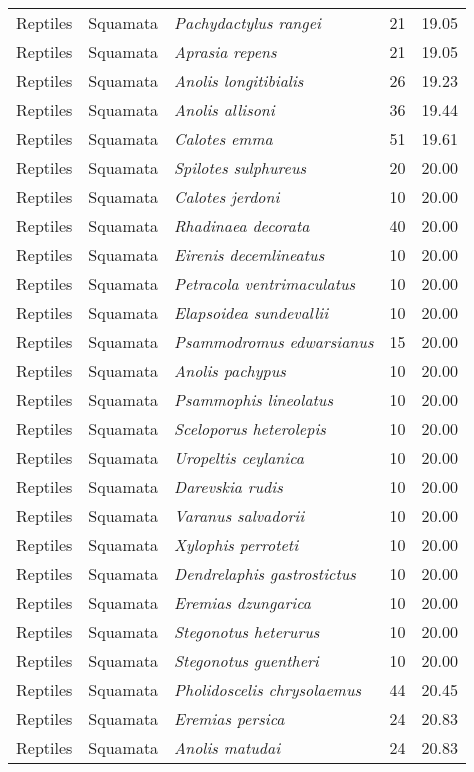 \begin{longtable}{ll>{\itshape}lcc}
  Reptiles & Squamata & Pachydactylus rangei &  21 & 19.05 \\ 
  Reptiles & Squamata & Aprasia repens &  21 & 19.05 \\ 
  Reptiles & Squamata & Anolis longitibialis &  26 & 19.23 \\ 
  Reptiles & Squamata & Anolis allisoni &  36 & 19.44 \\ 
  Reptiles & Squamata & Calotes emma &  51 & 19.61 \\ 
  Reptiles & Squamata & Spilotes sulphureus &  20 & 20.00 \\ 
  Reptiles & Squamata & Calotes jerdoni &  10 & 20.00 \\ 
  Reptiles & Squamata & Rhadinaea decorata &  40 & 20.00 \\ 
  Reptiles & Squamata & Eirenis decemlineatus &  10 & 20.00 \\ 
  Reptiles & Squamata & Petracola ventrimaculatus &  10 & 20.00 \\ 
  Reptiles & Squamata & Elapsoidea sundevallii &  10 & 20.00 \\ 
  Reptiles & Squamata & Psammodromus edwarsianus &  15 & 20.00 \\ 
  Reptiles & Squamata & Anolis pachypus &  10 & 20.00 \\ 
  Reptiles & Squamata & Psammophis lineolatus &  10 & 20.00 \\ 
  Reptiles & Squamata & Sceloporus heterolepis &  10 & 20.00 \\ 
  Reptiles & Squamata & Uropeltis ceylanica &  10 & 20.00 \\ 
  Reptiles & Squamata & Darevskia rudis &  10 & 20.00 \\ 
  Reptiles & Squamata & Varanus salvadorii &  10 & 20.00 \\ 
  Reptiles & Squamata & Xylophis perroteti &  10 & 20.00 \\ 
  Reptiles & Squamata & Dendrelaphis gastrostictus &  10 & 20.00 \\ 
  Reptiles & Squamata & Eremias dzungarica &  10 & 20.00 \\ 
  Reptiles & Squamata & Stegonotus heterurus &  10 & 20.00 \\ 
  Reptiles & Squamata & Stegonotus guentheri &  10 & 20.00 \\ 
  Reptiles & Squamata & Pholidoscelis chrysolaemus &  44 & 20.45 \\ 
  Reptiles & Squamata & Eremias persica &  24 & 20.83 \\ 
  Reptiles & Squamata & Anolis matudai &  24 & 20.83 \\ 

\end{longtable}
